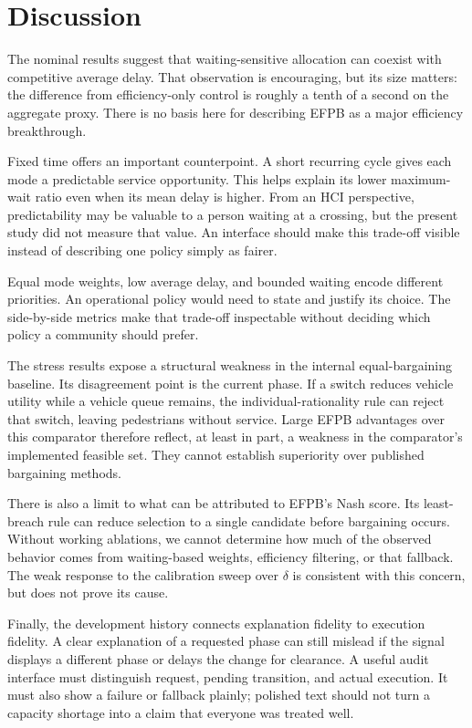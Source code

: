 \documentclass[sigconf]{acmart}
\begin{document}
\section{Discussion}
The nominal results suggest that waiting-sensitive allocation can
coexist with competitive average delay. That observation is
encouraging, but its size matters: the difference from efficiency-only
control is roughly a tenth of a second on the aggregate proxy.
There is no basis here for describing EFPB as a major efficiency
breakthrough.

Fixed time offers an important counterpoint. A short recurring
cycle gives each mode a predictable service opportunity. This
helps explain its lower maximum-wait ratio even when its mean
delay is higher. From an HCI perspective, predictability may be
valuable to a person waiting at a crossing, but the present study
did not measure that value. An interface should make this
trade-off visible instead of describing one policy simply as
fairer.

Equal mode weights, low average delay, and bounded waiting encode
different priorities. An operational policy would need to state and
justify its choice. The side-by-side metrics make that trade-off
inspectable without deciding which policy a community should prefer.

The stress results expose a structural weakness in the internal
equal-bargaining baseline. Its disagreement point is the current
phase. If a switch reduces vehicle utility while a vehicle queue
remains, the individual-rationality rule can reject that switch,
leaving pedestrians without service. Large EFPB advantages over
this comparator therefore reflect, at least in part, a weakness in
the comparator's implemented feasible set. They cannot establish
superiority over published bargaining methods.

There is also a limit to what can be attributed to EFPB's Nash
score. Its least-breach rule can reduce selection to a single
candidate before bargaining occurs. Without working ablations,
we cannot determine how much of the observed behavior comes
from waiting-based weights, efficiency filtering, or that fallback.
The weak response to the calibration sweep over $\delta$ is
consistent with this concern, but does not prove its cause.

Finally, the development history connects explanation fidelity to
execution fidelity. A clear explanation of a requested phase can
still mislead if the signal displays a different phase or delays the
change for clearance. A useful audit interface must distinguish
request, pending transition, and actual execution. It must also
show a failure or fallback plainly; polished text should not turn
a capacity shortage into a claim that everyone was treated well.
\end{document}
